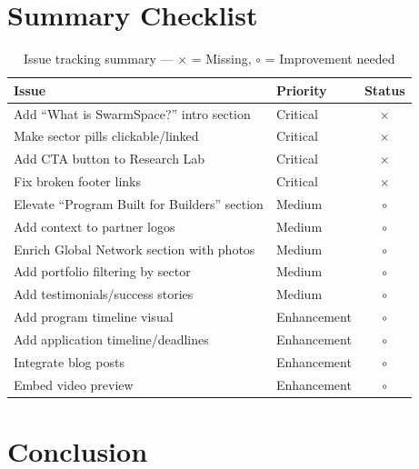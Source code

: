 \documentclass[12pt,a4paper]{article}
\begin{document}
\newpage

\section{Summary Checklist}

\begin{table}[H]
\centering
\begin{tabular}{@{}llc@{}}
\toprule
\textbf{Issue} & \textbf{Priority} & \textbf{Status} \\
\midrule
Add ``What is SwarmSpace?'' intro section & \textcolor{criticalred}{Critical} & $\times$ \\
Make sector pills clickable/linked & \textcolor{criticalred}{Critical} & $\times$ \\
Add CTA button to Research Lab & \textcolor{criticalred}{Critical} & $\times$ \\
Fix broken footer links & \textcolor{criticalred}{Critical} & $\times$ \\
\midrule
Elevate ``Program Built for Builders'' section & \textcolor{warningorange}{Medium} & $\circ$ \\
Add context to partner logos & \textcolor{warningorange}{Medium} & $\circ$ \\
Enrich Global Network section with photos & \textcolor{warningorange}{Medium} & $\circ$ \\
Add portfolio filtering by sector & \textcolor{warningorange}{Medium} & $\circ$ \\
Add testimonials/success stories & \textcolor{warningorange}{Medium} & $\circ$ \\
\midrule
Add program timeline visual & \textcolor{enhancementblue}{Enhancement} & $\circ$ \\
Add application timeline/deadlines & \textcolor{enhancementblue}{Enhancement} & $\circ$ \\
Integrate blog posts & \textcolor{enhancementblue}{Enhancement} & $\circ$ \\
Embed video preview & \textcolor{enhancementblue}{Enhancement} & $\circ$ \\
\bottomrule
\end{tabular}
\caption{Issue tracking summary --- $\times$ = Missing, $\circ$ = Improvement needed}
\end{table}

\newpage

\section{Conclusion}
\end{document}
